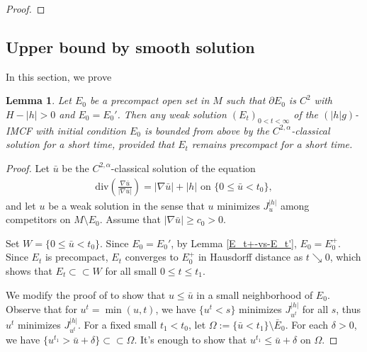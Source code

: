\documentclass[11pt, letterpaper]{amsart}
\newtheorem{lem}[thm]{Lemma}
\theoremstyle{definition}
\theoremstyle{remark}
\begin{document}
\begin{appendix}
\begin{proof}
\end{proof}



\subsection{Upper bound by smooth solution}
In this section, we prove
\begin{lem}\label{appen-upper-smooth}
	Let $E_0$ be a precompact open set in $M$ such that $\partial E_0$ is $C^2$ with $H- |h|>0$ and $E_0 = E_0'$. Then any weak solution $(E_t)_{0<t<\infty}$ of the $(|h|g)$-IMCF with initial condition $E_0$ is bounded from above by the $C^{2,\alpha }$-classical solution for a short time, provided that $E_t$ remains precompact for a short time.
\end{lem}

\begin{proof}
Let $\bar{u}$ be the $C^{2,\alpha }$-classical solution of the equation 
	\begin{align*}
		\mathrm{div}\left( \frac{\nabla \bar{u}}{|\nabla \bar{u}|} \right) = |\nabla \bar{u}| + |h| \text{ on }  \{0 \leq \bar{u}< t_0\},
	\end{align*} 
	and let $u$ be a weak solution in the sense that $u$ minimizes $J^{|h|}_{u}$ among competitors on $M \setminus E_0$. Assume that $|\nabla \bar{u}| \geq c_0>0$. 

Set $W = \{0 \leq \bar{u}< t_0\} $. Since $E_0 = E_0'$, by Lemma \ref{E_t+-vs-E_t'}, $E_0= E_0 ^{+}$. Since $E_t$ is precompact, $E_t$ converges to $E_0^+$ in Hausdorff distance as $t \searrow 0$, which shows that $E_t \subset \subset W$ for all small $0\leq t \leq t_1$.

	We modify the proof of \cite[Theorem 2.2]{HI01} to show that $u \leq \bar{u}$ in a small neighborhood of $E_0$. Observe that for $u ^{t} = \min(u, t)$, we have $\{u ^{t} < s\} $ minimizes $J^{|h|}_{u ^{t}}$ for all $s$, thus $u ^{t}$ minimizes $J^{|h|}_{u ^{t}}$. For a fixed small $t_1< t_0$, let $\Omega := \{ \bar{u}< t_1\}  \setminus \bar{E}_0$. For each $\delta >0$, we have $\{u ^{t_1} > \bar{u} + \delta \} \subset \subset \Omega $. It's enough to show that $u ^{t_1} \leq \bar{u}+ \delta $ on $\Omega $. 


\end{proof}
\end{appendix}
\end{document}
